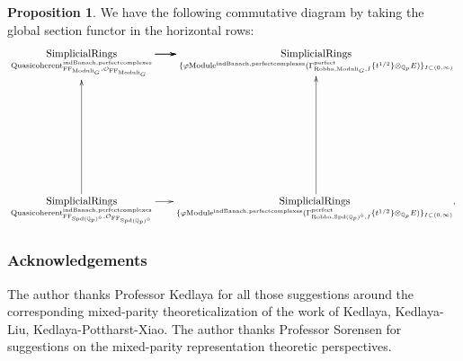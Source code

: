\documentclass[12pt]{book}
\theoremstyle{definition}
\newtheorem{proposition}{Proposition}
\begin{document}
\begin{proposition}
We have the following commutative diagram by taking the global section functor in the horizontal rows:
\[\displayindent=+0in
\xymatrix@C-0.1in@R+7pc{
\underset{\mathrm{Quasicoherent}^{\mathrm{indBanach,perfectcomplexes}}_{\mathrm{FF}_{\mathrm{Moduli}_G},\mathcal{O}_{\mathrm{FF}_{\mathrm{Moduli}_G}}}}{\mathrm{SimplicialRings}}  \ar[r] \ar[r] \ar[r] &\underset{\{\varphi\mathrm{Module}^{\mathrm{indBanach,perfectcomplexes}}(\Gamma^\text{perfect}_{\text{Robba},{\mathrm{Moduli}_G},I}\{t^{1/2}\}\otimes_{\mathbb{Q}_p}E)\}_{I\subset (0,\infty)}}{\mathrm{SimplicialRings}}   \\
\underset{\mathrm{Quasicoherent}^{\mathrm{indBanach,perfectcomplexes}}_{\mathrm{FF}_{\mathrm{Spd}(\mathbb{Q}_p)^\diamond},\mathcal{O}_{\mathrm{FF}_{\mathrm{Spd}(\mathbb{Q}_p)^\diamond}}}}{\mathrm{SimplicialRings}} \ar[u]\ar[r] &\underset{\{\varphi\mathrm{Module}^{\mathrm{indBanach,perfectcomplexes}}(\Gamma^\text{perfect}_{\text{Robba},{\mathrm{Spd}(\mathbb{Q}_p)^\diamond},I}\{t^{1/2}\}\otimes_{\mathbb{Q}_p}E)\}_{I\subset (0,\infty)}}{\mathrm{SimplicialRings}}.\ar[u]  
}
\]

\end{proposition}











\newpage
\subsubsection*{Acknowledgements}
The author thanks Professor Kedlaya for all those suggestions around the corresponding mixed-parity theoreticalization of the work of Kedlaya, Kedlaya-Liu, Kedlaya-Pottharst-Xiao. The author thanks Professor Sorensen for suggestions on the mixed-parity representation theoretic perspectives.
\end{document}
